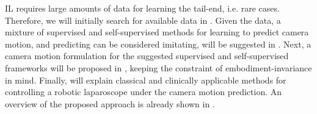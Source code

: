 IL requires large amounts of data for learning the tail-end, i.e. rare cases. Therefore, we will initially search for available data in . Given the data, a mixture of supervised and self-supervised methods for learning to predict camera motion, and predicting can be considered imitating, will be suggested in . Next, a camera motion formulation for the suggested supervised and self-supervised frameworks will be proposed in , keeping the constraint of embodiment-invariance in mind. Finally,  will explain classical and clinically applicable methods for controlling a robotic laparoscope under the camera motion prediction.  An overview of the proposed approach is already shown in .

